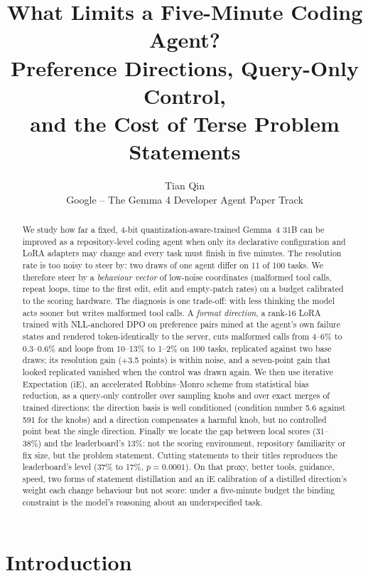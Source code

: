 \documentclass[11pt]{article}
\title{What Limits a Five-Minute Coding Agent?\\Preference Directions, Query-Only Control,\\and the Cost of Terse Problem Statements}
\author{Tian Qin\\\small Google -- The Gemma 4 Developer Agent Paper Track}
\date{}
\begin{document}
\maketitle

\begin{abstract}
We study how far a fixed, 4-bit quantization-aware-trained Gemma~4 31B can be improved as a repository-level coding agent when only its declarative configuration and LoRA adapters may change and every task must finish in five minutes. The resolution rate is too noisy to steer by: two draws of one agent differ on 11 of 100 tasks. We therefore steer by a \emph{behaviour vector} of low-noise coordinates (malformed tool calls, repeat loops, time to the first edit, edit and empty-patch rates) on a budget calibrated to the scoring hardware. The diagnosis is one trade-off: with less thinking the model acts sooner but writes malformed tool calls. A \emph{format direction}, a rank-16 LoRA trained with NLL-anchored DPO on preference pairs mined at the agent's own failure states and rendered token-identically to the server, cuts malformed calls from 4--6\% to 0.3--0.6\% and loops from 10--13\% to 1--2\% on 100 tasks, replicated against two base draws; its resolution gain (+3.5 points) is within noise, and a seven-point gain that looked replicated vanished when the control was drawn again. We then use iterative Expectation (iE), an accelerated Robbins--Monro scheme from statistical bias reduction, as a query-only controller over sampling knobs and over exact merges of trained directions: the direction basis is well conditioned (condition number 5.6 against 591 for the knobs) and a direction compensates a harmful knob, but no controlled point beat the single direction. Finally we locate the gap between local scores (31--38\%) and the leaderboard's 13\%: not the scoring environment, repository familiarity or fix size, but the problem statement. Cutting statements to their titles reproduces the leaderboard's level (37\% to 17\%, $p = 0.0001$). On that proxy, better tools, guidance, speed, two forms of statement distillation and an iE calibration of a distilled direction's weight each change behaviour but not score: under a five-minute budget the binding constraint is the model's reasoning about an underspecified task.
\end{abstract}

\section{Introduction}
\end{document}
